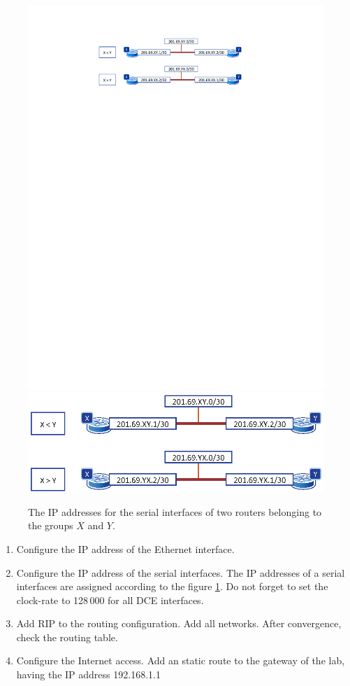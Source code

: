 \begin{figure}
\centering
\ifpdf
\includegraphics[width=0.9\linewidth]{Figures/FinalRoutersSerial.pdf}
\else
\includegraphics[width=0.9\linewidth]{Figures/FinalRoutersSerial.eps}
\fi
\caption{The IP addresses for the serial interfaces of two routers belonging to the groups $X$ and $Y$.}
\label{fig:FinalRoutersSerial}
\end{figure}

\begin{enumerate}
\item Configure the IP address of the Ethernet interface.
\item Configure the IP address of the serial interfaces. The IP addresses of a serial interfaces are assigned according to the figure \ref{fig:FinalRoutersSerial}. Do not forget to set the clock-rate to 128\,000 for all DCE interfaces.
\item Add RIP to the routing configuration. Add all networks. After convergence, check the routing table.
\item Configure the Internet access. Add an static route to the gateway of the lab, having the IP address 192.168.1.1
\end{enumerate}

